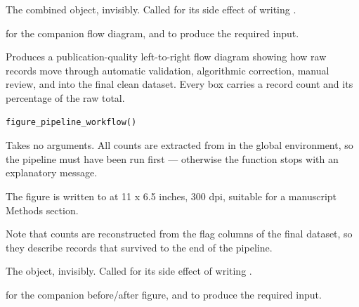 \documentclass[a4paper]{book}
\begin{document}
%
\begin{Value}
The combined  object, invisibly. Called for its side effect of
writing .
\end{Value}
%
\begin{SeeAlso}
 for the companion flow diagram, and
 to produce the required input.
\end{SeeAlso}
%
\begin{Description}
Produces a publication-quality left-to-right flow diagram showing how raw
records move through automatic validation, algorithmic correction, manual
review, and into the final clean dataset. Every box carries a record count
and its percentage of the raw total.
\end{Description}
%
\begin{Usage}
\begin{verbatim}
figure_pipeline_workflow()
\end{verbatim}
\end{Usage}
%
\begin{Details}
Takes no arguments. All counts are extracted from 
in the global environment, so the pipeline must have been run first ---
otherwise the function stops with an explanatory message.

The figure is written to  at
11 x 6.5 inches, 300 dpi, suitable for a manuscript Methods section.

Note that counts are reconstructed from the flag columns of the final
dataset, so they describe records that survived to the end of the pipeline.
\end{Details}
%
\begin{Value}
The  object, invisibly. Called for its side effect of
writing .
\end{Value}
%
\begin{SeeAlso}
 for the companion before/after figure,
and  to produce the required input.
\end{SeeAlso}
\end{document}
